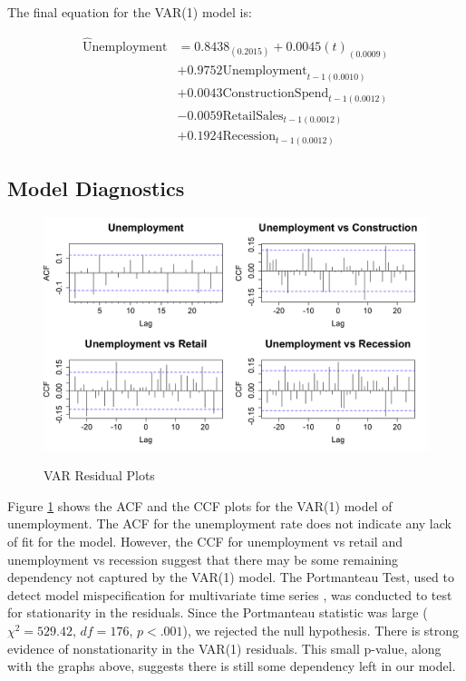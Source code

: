 \documentclass[twoside,twocolumn]{article}
\begin{document}
The final equation for the VAR(1) model is:

 \begin{align*}
  \widehat{\text{U}}\text{nemployment} &= 0.8438_{(0.2015)} +
  0.0045(t)_{(0.0009)}\\
  &+ 0.9752\text{Unemployment}_{t-1 (0.0010)}\\
  &+ 0.0043\text{ConstructionSpend}_{t-1(0.0012)}\\
  &- 0.0059\text{RetailSales}_{t-1(0.0012)}\\
  &+ 0.1924\text{Recession}_{t-1(0.0012)}
  \end{align*}

 \subsection{Model Diagnostics}
 \begin{figure}[hbt]
	\centering
	\caption{VAR Residual Plots}
	\includegraphics[width=\linewidth]{images/CCFplots}
	\label{fig:CCF}
\end{figure}

Figure \ref{fig:CCF} shows the ACF and the CCF plots for the VAR(1) model of unemployment.  The ACF for the unemployment rate does not indicate any lack of fit for the model. However, the CCF for unemployment vs retail and unemployment vs recession suggest that there may be some remaining dependency not captured by the VAR(1) model.   The Portmanteau Test, used to detect model mispecification for multivariate time series \citep{davies1979}, was conducted to test for stationarity in the residuals. Since the Portmanteau statistic was large (\(\chi^2=529.42\), \(df = 176\), \(p < .001\)), we rejected the null hypothesis. There is  strong evidence of nonstationarity in the VAR(1) residuals. This small p-value, along with the graphs above, suggests there is still some dependency left in our model.
\end{document}
